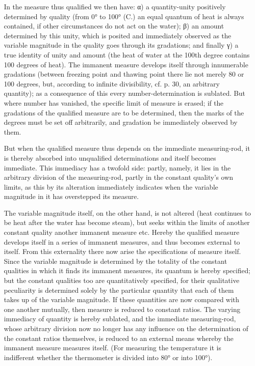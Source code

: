 \documentclass[12pt,a4paper,openany]{book}
\newcommand{\opage}[1]{\marginnote{\footnotesize\textit{[#1]}}}
\begin{document}
In the measure thus qualified we then have: α) a quantity-unity positively determined by quality (from 0° to 100° (C.) an equal quantum of heat is always contained, if other circumstances do not act on the water); β) an amount determined by this unity, which is posited and immediately observed as the variable magnitude in the quality goes through its gradations; and finally γ) a true identity of unity and amount (the heat of water at the 100th degree contains 100 degrees of heat).
\setcounter{footnote}{0}%
\opage{65}The immanent measure develops itself through innumerable gradations (between freezing point and thawing point there lie not merely 80 or 100 degrees, but, according to infinite divisibility, cf. p. 30, an arbitrary quantity); as a consequence of this every number-determination is sublated. But where number has vanished, the specific limit of measure is erased; if the gradations of the qualified measure are to be determined, then the marks of the degrees must be set off arbitrarily, and gradation be immediately observed by them.

But when the qualified measure thus depends on the immediate measuring-rod, it is thereby absorbed into unqualified determinations and itself becomes immediate. This immediacy has a twofold side: partly, namely, it lies in the arbitrary division of the measuring-rod, partly in the constant quality's own limits, as this by its alteration immediately indicates when the variable magnitude in it has overstepped its measure.

The variable magnitude itself, on the other hand, is not altered (heat continues to be heat after the water has become steam), but seeks within the limits of another constant quality another immanent measure etc. Hereby the qualified measure develops itself in a series of immanent measures, and thus becomes external to itself. From this externality there now arise the specifications of measure itself. Since the variable magnitude is determined by the totality of the constant qualities in which it finds its immanent measures, its quantum is hereby specified; but the constant qualities too are quantitatively specified, for their qualitative peculiarity is determined solely by the particular quantity that each of them takes up of the variable magnitude. If these quantities are now compared with one another mutually, then measure is reduced to constant
\setcounter{footnote}{0}%
\opage{66}ratios. The varying immediacy of quantity is hereby sublated, and the immediate measuring-rod, whose arbitrary division now no longer has any influence on the determination of the constant ratios themselves, is reduced to an external means whereby the immanent measure measures itself. (For measuring the temperature it is indifferent whether the thermometer is divided into 80° or into 100°).
\end{document}
